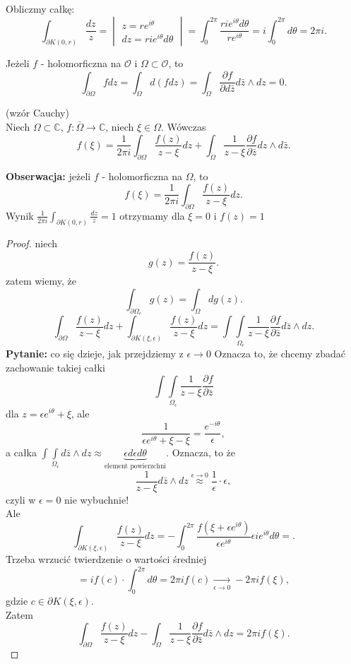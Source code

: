 \documentclass[../main.tex]{subfiles}
\begin{document}
\begin{przyklad}
    Obliczmy całkę:
    \[
        \int_{\partial K(0,r)} \frac{dz}{z} = \begin{vmatrix} z = re^{i\theta}\\ dz = rie^{i\theta}d\theta \end{vmatrix} = \int_0^{2\pi} \frac{rie^{i\theta}d\theta}{re^{i\theta}} = i \int_0^{2\pi}d\theta = 2\pi i
    .\]
\end{przyklad}
\begin{stw}
    Jeżeli $f$ - holomorficzna na $\mathcal{O}$ i $\Omega \subset\mathcal{O}$, to
    \[
        \int_{\partial \Omega} fdz = \int_\Omega d(fdz) = \int_{\Omega} \frac{\partial f}{\partial d\bar{z}} d\bar{z}\land dz = 0
    .\]
\end{stw}
\begin{tw}
    (wzór Cauchy)\\
    Niech $\Omega\subset\mathbb{C}$, $f: \bar{\Omega} \to \mathbb{C}$, niech $\xi \in \Omega$. Wówczas  \[
        f(\xi) = \frac{1}{2\pi i }\int_{\partial \Omega}\frac{f(z)}{z-\xi}dz + \int_{\Omega} \frac{1}{z - \xi}\frac{\partial f}{\partial \bar{z}} dz\land d\bar{z}
    .\]
\end{tw}
\textbf{Obserwacja:} jeżeli $f$ - holomorficzna na $\Omega$, to
\[
    f(\xi) = \frac{1}{2\pi i} \int_{\partial \Omega}\frac{f(z)}{z - \xi} dz
.\]
Wynik $\frac{1}{2\pi i }\int_{\partial K(0,r)} \frac{dz}{z} = 1$ otrzymamy dla $\xi = 0$ i $f(z) = 1$
 \begin{proof}
     niech
     \[
         g(z) = \frac{f(z)}{z - \xi}
     .\]
     zatem wiemy, że
     \[
         \int_{\partial \Omega_\epsilon}g(z) = \int_{\Omega} d g(z)
     .\]
 \[
     \int_{\partial \Omega} \frac{f(z)}{z - \xi}dz + \int_{\partial K(\xi, \epsilon)} \frac{f(z)}{z - \xi}dz = \int\int\limits_{\Omega_\epsilon}\frac{1}{z-\xi} \frac{\partial f}{\partial \bar{z}} d\bar{z}\land dz
 .\]
 \textbf{Pytanie:} co się dzieje, jak przejdziemy z $\epsilon\to 0$ Oznacza to, że chcemy zbadać zachowanie takiej całki
     \[
         \int\int\limits_{\Omega_{\epsilon}} \frac{1}{z-\xi}\frac{\partial f}{\partial \bar{z}}
     \]
 dla $z = \epsilon e^{i\theta} + \xi$, ale
     \[
         \frac{1}{\epsilon e^{i\theta} + \xi - \xi} = \frac{e^{-i\theta}}{\epsilon}
     ,\]
 a całka $\int\int\limits_{\Omega_\epsilon} d\bar{z}\land dz \approx \underbrace{\epsilon d\epsilon d\theta}_{\text{element powierzchni}}$.
     Oznacza, to że
     \[
         \frac{1}{z-\xi} d\bar{z}\land dz \overset{\epsilon \to 0}{\approx} \frac{1}{\epsilon} \cdot \epsilon
     ,\]
 czyli w $\epsilon = 0$ nie wybuchnie!\\
     Ale
     \[
         \int_{\partial K(\xi, \epsilon)} \frac{f(z)}{z-\xi} dz = - \int_0^{2\pi} \frac{f(\xi + \epsilon e^{i\theta})}{\epsilon e^{i\theta}} \epsilon i e^{i\theta} d\theta =
     .\]
 Trzeba wrzucić twierdzenie o wartości średniej
     \[
         = i f(c) \cdot \int_{0}^{2\pi}d\theta = 2 \pi i f(c) \underset{\epsilon \to 0}{\longrightarrow}-2\pi i f(\xi)
     ,\]
 gdzie $c\in \partial K(\xi, \epsilon)$.\\
     Zatem
     \[
         \int_{\partial \Omega} \frac{f(z)}{z - \xi}dz - \int_{\Omega}\frac{1}{z-\xi}\frac{\partial f}{\partial \bar{z}} d\bar{z}\land dz = 2 \pi i f(\xi)
     .\]
\end{proof}
\end{document}
